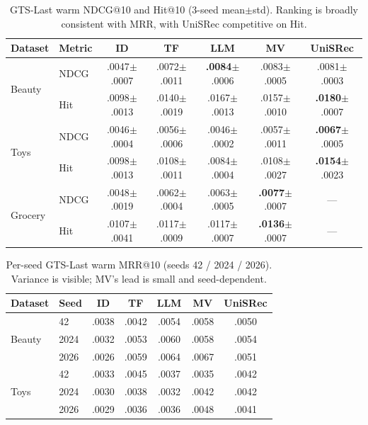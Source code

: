 \documentclass[sigconf,natbib=true,anonymous]{acmart}
\begin{document}
\begin{table}[t]
\centering
\caption{%
GTS-Last warm NDCG@10 and Hit@10 (3-seed mean$\pm$std).
Ranking is broadly consistent with MRR, with UniSRec competitive on Hit.%
}
\label{tab:ndcg_hit}
\small
\setlength{\tabcolsep}{3pt}
\begin{tabular}{@{}llccccc@{}}
\toprule
Dataset & Metric & ID & TF & LLM & MV & UniSRec \\
\midrule
\multirow{2}{*}{Beauty}
 & NDCG & .0047\tiny{$\pm$.0007} & .0072\tiny{$\pm$.0011} & \textbf{.0084}\tiny{$\pm$.0006} & .0083\tiny{$\pm$.0005} & .0081\tiny{$\pm$.0003} \\
 & Hit  & .0098\tiny{$\pm$.0013} & .0140\tiny{$\pm$.0019} & .0167\tiny{$\pm$.0013} & .0157\tiny{$\pm$.0010} & \textbf{.0180}\tiny{$\pm$.0007} \\
\midrule
\multirow{2}{*}{Toys}
 & NDCG & .0046\tiny{$\pm$.0004} & .0056\tiny{$\pm$.0006} & .0046\tiny{$\pm$.0002} & .0057\tiny{$\pm$.0011} & \textbf{.0067}\tiny{$\pm$.0005} \\
 & Hit  & .0098\tiny{$\pm$.0013} & .0108\tiny{$\pm$.0011} & .0084\tiny{$\pm$.0004} & .0108\tiny{$\pm$.0027} & \textbf{.0154}\tiny{$\pm$.0023} \\
\midrule
\multirow{2}{*}{Grocery}
 & NDCG & .0048\tiny{$\pm$.0019} & .0062\tiny{$\pm$.0004} & .0063\tiny{$\pm$.0005} & \textbf{.0077}\tiny{$\pm$.0007} & --- \\
 & Hit  & .0107\tiny{$\pm$.0041} & .0117\tiny{$\pm$.0009} & .0117\tiny{$\pm$.0007} & \textbf{.0136}\tiny{$\pm$.0007} & --- \\
\bottomrule
\end{tabular}
\end{table}

\begin{table}[t]
\centering
\caption{%
Per-seed GTS-Last warm MRR@10 (seeds 42 / 2024 / 2026).
Variance is visible; MV's lead is small and seed-dependent.%
}
\label{tab:perseed}
\small
\setlength{\tabcolsep}{3.5pt}
\begin{tabular}{@{}llccccc@{}}
\toprule
Dataset & Seed & ID & TF & LLM & MV & UniSRec \\
\midrule
\multirow{3}{*}{Beauty}
 & 42    & .0038 & .0042 & .0054 & .0058 & .0050 \\
 & 2024  & .0032 & .0053 & .0060 & .0058 & .0054 \\
 & 2026  & .0026 & .0059 & .0064 & .0067 & .0051 \\
\midrule
\multirow{3}{*}{Toys}
 & 42    & .0033 & .0045 & .0037 & .0035 & .0042 \\
 & 2024  & .0030 & .0038 & .0032 & .0042 & .0042 \\
 & 2026  & .0029 & .0036 & .0036 & .0048 & .0041 \\
\bottomrule
\end{tabular}
\end{table}
\end{document}
